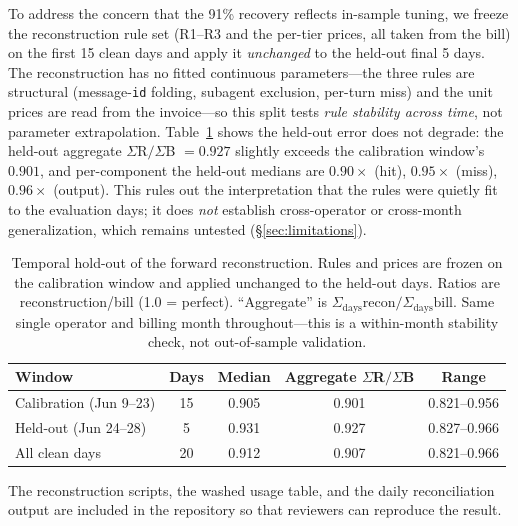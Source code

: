 \documentclass[11pt]{article}
\theoremstyle{definition}
\theoremstyle{remark}
\begin{document}
To address the concern that the 91\% recovery reflects in-sample tuning, we freeze the reconstruction rule set (R1--R3 and the per-tier prices, all taken from the bill) on the first 15 clean days and apply it \emph{unchanged} to the held-out final 5 days. The reconstruction has no fitted continuous parameters---the three rules are structural (message-\texttt{id} folding, subagent exclusion, per-turn miss) and the unit prices are read from the invoice---so this split tests \emph{rule stability across time}, not parameter extrapolation. Table~\ref{tab:tempsplit} shows the held-out error does not degrade: the held-out aggregate $\Sigma$R$/\Sigma$B $= 0.927$ slightly exceeds the calibration window's $0.901$, and per-component the held-out medians are $0.90\times$ (hit), $0.95\times$ (miss), $0.96\times$ (output). This rules out the interpretation that the rules were quietly fit to the evaluation days; it does \emph{not} establish cross-operator or cross-month generalization, which remains untested (\S\ref{sec:limitations}).

\begin{table}[ht]
\centering
\caption{Temporal hold-out of the forward reconstruction. Rules and prices are frozen on the calibration window and applied unchanged to the held-out days. Ratios are reconstruction/bill (1.0 = perfect). ``Aggregate'' is $\Sigma_{\text{days}}\text{recon}/\Sigma_{\text{days}}\text{bill}$. Same single operator and billing month throughout---this is a within-month stability check, not out-of-sample validation.}
\label{tab:tempsplit}
\begin{tabular}{l c c c c}
\toprule
Window & Days & Median & Aggregate $\Sigma$R$/\Sigma$B & Range \\
\midrule
Calibration (Jun 9--23) & 15 & 0.905 & 0.901 & 0.821--0.956 \\
Held-out (Jun 24--28)   & 5  & 0.931 & 0.927 & 0.827--0.966 \\
\midrule
All clean days          & 20 & 0.912 & 0.907 & 0.821--0.966 \\
\bottomrule
\end{tabular}
\end{table}

The reconstruction scripts, the washed usage table, and the daily reconciliation output are included in the repository so that reviewers can reproduce the result.
\end{document}
